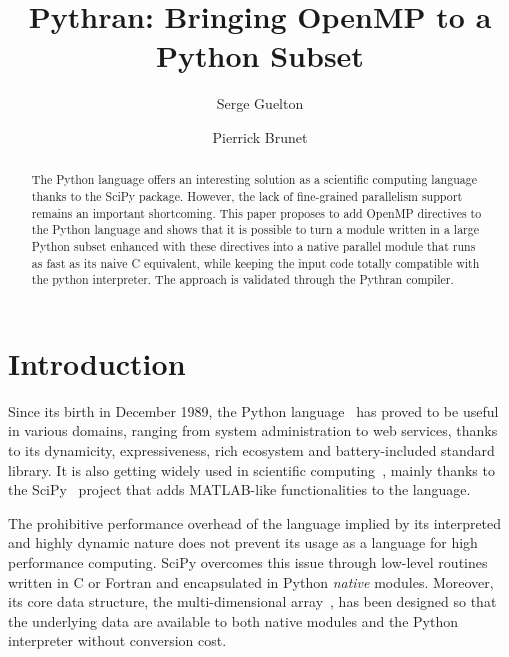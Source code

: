 \documentclass{llncs}
\begin{document}
\renewcommand{\thelstlisting}{\arabic{lstlisting}}
%
\title{Pythran: Bringing OpenMP to a Python Subset}

\author{Serge Guelton \and Pierrick Brunet}


\maketitle

%
\begin{abstract}

    The Python language offers an interesting solution as a scientific
    computing language thanks to the SciPy package. However, the lack of
    fine-grained parallelism support remains an important shortcoming. This
    paper proposes to add OpenMP directives to the Python language and shows
    that it is possible to turn a module written in a large Python subset
    enhanced with these directives into a native parallel module that runs as
    fast as its naive C equivalent, while keeping the input code totally
    compatible with the python interpreter. The approach is validated through
    the Pythran compiler.

\end{abstract}

%
\section{Introduction}

Since its birth in December 1989, the Python language~\cite{rossum97} has proved
to be useful in various domains, ranging from system administration to web
services, thanks to its dynamicity, expressiveness, rich ecosystem and
battery-included standard library. It is also getting widely used in scientific
computing~\cite{Oliphant2007}, mainly thanks to the SciPy~\cite{scipy} project
that adds MATLAB-like functionalities to the language.

The prohibitive performance overhead of the language implied by its interpreted
and highly dynamic nature does not prevent its usage as a language for high
performance computing. SciPy overcomes this issue through low-level routines
written in C or Fortran and encapsulated in Python \emph{native} modules.
Moreover, its core data structure, the multi-dimensional
array~\cite{numpyarray2011}, has been designed so that the underlying data are
available to both native modules and the Python interpreter without conversion
cost.
\end{document}
